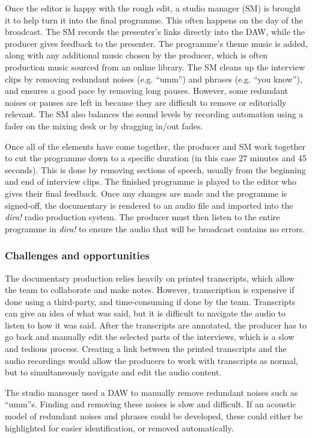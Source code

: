 Once the editor is happy with the rough edit, a studio manager (SM) is brought it to help turn it into the final
programme.  This often happens on the day of the broadcast.  The SM records the presenter's links directly into the
DAW, while the producer gives feedback to the presenter.  The programme's theme music is added, along with any
additional music chosen by the producer, which is often production music sourced from an online library.  The SM cleans
up the interview clips by removing redundant noises (e.g. ``umm'') and phrases (e.g. ``you know''), and ensures a good
pace by removing long pauses. However, some redundant noises or pauses are left in because they are difficult to remove
or editorially relevant.  The SM also balances the sound levels by recording automation using a fader on the mixing
desk or by dragging in/out fades. 

Once all of the elements have come together, the producer and SM work together to cut the programme down to a specific
duration (in this case 27 minutes and 45 seconds). This is done by removing sections of speech, usually from the
beginning and end of interview clips.  The finished programme is played to the editor who gives their final feedback.
Once any changes are made and the programme is signed-off, the documentary is rendered to an audio file and imported
into the \textit{dira!} radio production system. The producer must then listen to the entire programme in
\textit{dira!} to ensure the audio that will be broadcast contains no errors.

\subsubsection{Challenges and opportunities}
The documentary production relies heavily on printed transcripts, which allow the team to collaborate and make notes.
However, transcription is expensive if done using a third-party, and time-consuming if done by the team.  Transcripts
can give an idea of what was said, but it is difficult to navigate the audio to listen to how it was said.  After the
transcripts are annotated, the producer has to go back and manually edit the selected parts of the interviews, which is
a slow and tedious process.  Creating a link between the printed transcripts and the audio recordings would allow the
producers to work with transcripts as normal, but to simultaneously navigate and edit the audio content.

The studio manager used a DAW to manually remove redundant noises such as ``umm''s.  Finding and removing these noises
is slow and difficult. If an acoustic model of redundant noises and phrases could be developed, these could either be
highlighted for easier identification, or removed automatically.

